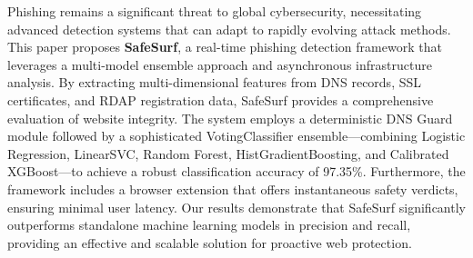 Phishing remains a significant threat to global cybersecurity, necessitating advanced detection systems that can adapt to rapidly evolving attack methods. This paper proposes \textbf{SafeSurf}, a real-time phishing detection framework that leverages a multi-model ensemble approach and asynchronous infrastructure analysis. By extracting multi-dimensional features from DNS records, SSL certificates, and RDAP registration data, SafeSurf provides a comprehensive evaluation of website integrity. The system employs a deterministic DNS Guard module followed by a sophisticated VotingClassifier ensemble—combining Logistic Regression, LinearSVC, Random Forest, HistGradientBoosting, and Calibrated XGBoost—to achieve a robust classification accuracy of 97.35\%. Furthermore, the framework includes a browser extension that offers instantaneous safety verdicts, ensuring minimal user latency. Our results demonstrate that SafeSurf significantly outperforms standalone machine learning models in precision and recall, providing an effective and scalable solution for proactive web protection.
